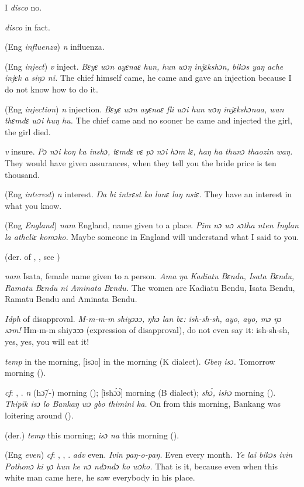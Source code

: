 \begin{letter}{I}
 \textit{disco} no.

 \textit{disco} in fact.

 (Eng \textit{influenza}) \textit{n} influenza.

 (Eng \textit{inject}) \textit{v} inject. \textit{Bɛyɛ wɔn ayɛnaɛ hun, hun wɔŋ injɛkshɔn, bikɔs yaŋ ache injɛk a siŋɔ ni.} The chief himself came, he came and gave an injection because I do not know how to do it.

 (Eng \textit{injection}) \textit{n} injection. \textit{Bɛyɛ wɔn ayɛnaɛ fli wɔi hun wɔŋ injɛkshɔnaa, wan thɛmdɛ wɔi huŋ hu.} The chief came and no sooner he came and injected the girl, the girl died.

 \textit{v} insure. \textit{Pɔ nɔi koŋ ka inshɔ, tɛmdɛ vɛ pɔ nɔi hɔm lɛ, haŋ ha thunɔ thaozin waŋ.} They would have given assurances, when they tell you the bride price is ten thousand.

 (Eng \textit{interest}) \textit{n} interest. \textit{Ŋa bi intrɛst ko lanɛ laŋ nsiɛ.} They have an interest in what you know.

 (Eng \textit{England}) \textit{nam} England, name given to a place. \textit{Pim nɔ wɔ sɔtha nten Inglan la atheliɛ komɔko.} Maybe someone in England will understand what I said to you.

 (der. of , , see ) 

 \textit{nam} Isata, female name given to a person. \textit{Ama ŋa Kadiatu Bɛndu, Isata Bɛndu, Ramatu Bɛndu ni Aminata Bɛndu.} The women are Kadiatu Bendu, Isata Bendu, Ramatu Bendu and Aminata Bendu.

 \textit{Idph} of disapproval. \textit{M-m-m-m shiyɔɔɔ, ŋhɔ lan bɛ: ish-sh-sh, ayo, ayo, mɔ ŋɔ sɔm!} Hm-m-m shiyɔɔɔ (expression of disapproval), do not even say it: ish-sh-sh, yes, yes, you will eat it!

 \textit{temp} in the morning, [isɔo] in the morning (K dialect). \textit{Gbeŋ isɔ.} Tomorrow morning (\citealt{Pichl1967}).

 \textit{cf}: , . \textit{n} (hɔ̃/-) morning (\citealt{Pichl1967}); [ìshɔ́ɔ́] morning (B dialect); \textit{shɔ́, ishɔ} morning (\citealt{Sumner1921}). \textit{Thipïk isɔ lo Bankaŋ wɔ gbo thimini ka.} On from this morning, Bankang was loitering around (\citealt{Pichl1967}). 

 (der.) \textit{temp} this morning; \textit{isɔ na} this morning (\citealt{Pichl1967}). 

 (Eng \textit{even}) \textit{cf}: , , . \textit{adv} even. \textit{Ivin paŋ-o-paŋ.} Even every month. \textit{Ye lai bikɔs ivin Pothonɔ ki yɔ hun ke nɔ ndɔndɔ ko wɔko.} That is it, because even when this white man came here, he saw everybody in his place.

\end{letter}

